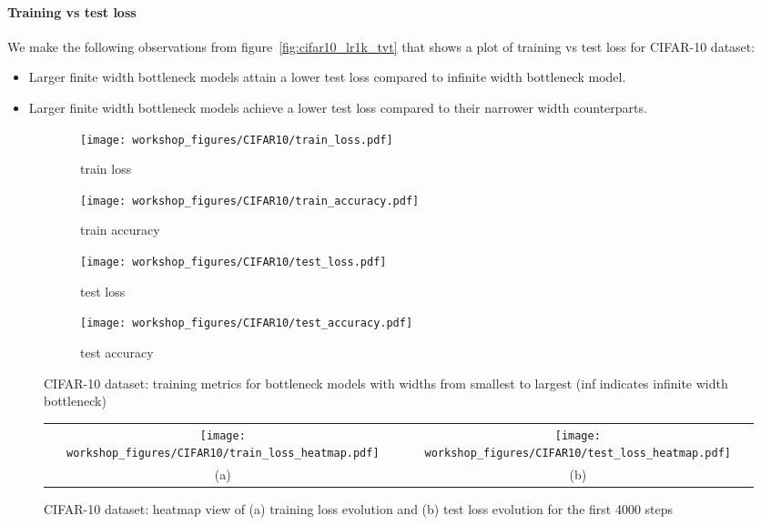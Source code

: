 \documentclass{article}
\theoremstyle{definition}
\theoremstyle{remark}
\renewcommand{\[}{\begin{eqnarray}}
\renewcommand{\]}{\end{eqnarray}}
\renewcommand{\[}{\begin{eqnarray}}
\renewcommand{\]}{\end{eqnarray}}
\begin{document}
\paragraph{Training vs test loss} We make the following observations from figure~\ref{fig:cifar10_lr1k_tvt} that shows a plot of training vs test loss for CIFAR-10 dataset:
\begin{itemize}
    \item Larger finite width bottleneck models attain a lower test loss compared to infinite width bottleneck model.
    \item Larger finite width bottleneck models achieve a lower test loss compared to their narrower width counterparts.
\end{itemize}
\begin{figure*}
    \begin{subfigure}[b]{0.25\textwidth}
        \texttt{[image: workshop\_figures/CIFAR10/train\_loss.pdf]}
        \caption{train loss}
        \label{fig:cifar10_lr1k_metrics:train_loss}
    \end{subfigure}\hfill
    \begin{subfigure}[b]{0.25\textwidth}
        \texttt{[image: workshop\_figures/CIFAR10/train\_accuracy.pdf]}
        \caption{train accuracy}
        \label{fig:cifar10_lr1k_metrics:train_acc}
    \end{subfigure}\hfill
    \begin{subfigure}[b]{0.25\textwidth}
        \texttt{[image: workshop\_figures/CIFAR10/test\_loss.pdf]}
        \caption{test loss}
        \label{fig:cifar10_lr1k_metrics:test_loss}
    \end{subfigure}\hfill
    \begin{subfigure}[b]{0.25\textwidth}
        \texttt{[image: workshop\_figures/CIFAR10/test\_accuracy.pdf]}
        \caption{test accuracy}
        \label{fig:cifar10_lr1k_metrics:test_acc}
    \end{subfigure}\hfill
    \caption{{CIFAR-10 dataset: training metrics for bottleneck models with widths from smallest to largest (inf indicates infinite width bottleneck)}}%
    \label{fig:cifar10_lr1k_metrics}
\end{figure*}

\begin{figure}[ht]
\centering
\begin{tabular}{cc}
\texttt{[image: workshop\_figures/CIFAR10/train\_loss\_heatmap.pdf]}&
\texttt{[image: workshop\_figures/CIFAR10/test\_loss\_heatmap.pdf]}\\
(a) & (b)\\
\end{tabular}
  \caption{{CIFAR-10 dataset: heatmap view of (a) training loss evolution and (b) test loss evolution for the first 4000 steps}}%
  \label{fig:cifar10_lr1k_heatmap}
\end{figure}
\end{document}
